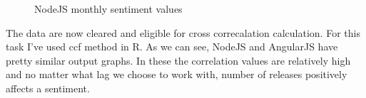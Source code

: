 \begin{figure}%
    \centering
    \qquad
    \caption{NodeJS monthly sentiment values}%
    \label{fig:NodeJS_Sentiment_before_after}%
\end{figure}

The data are now cleared and eligible for cross correcalation calculation. For this task I've used ccf method in R. As we can see, NodeJS and AngularJS have pretty similar output graphs. In these the correlation values are relatively high and no matter what lag we choose to work with, number of releases positively affects a sentiment.